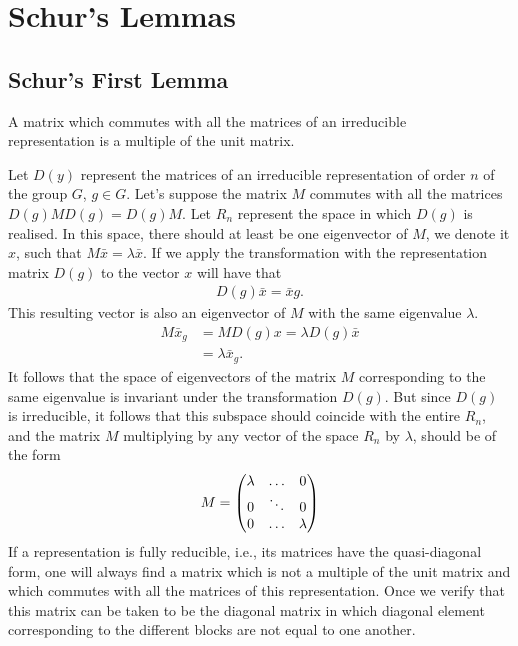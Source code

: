 \section{Schur's Lemmas}
\subsection{Schur's First Lemma} %
\label{sub:Schur's First Lemma}

\begin{epigraph}
    A matrix which commutes with all the matrices of an irreducible\\
    representation is a multiple of the unit matrix.
\end{epigraph}

Let $D(y)$ represent the matrices of an irreducible representation of order $n$
of the group $G$, $g\in G$. Let's suppose the matrix $M$ commutes with all the
matrices  $D(g)MD(g)=D(g)M$. Let $R_n$ represent the space in which $D(g)$ is
realised. In this space, there should at least be one eigenvector of $M$, we
denote it $x$, such that $M\bar{x}=\lambda\bar{x}$. If we apply the transformation with the representation matrix $D(g)$ to the vector $x$ will have that
\begin{align}
    D(g)\bar{x}=\bar{x}g.
\end{align}
This resulting vector is also an eigenvector of $M$ with the same eigenvalue
$\lambda$.
\begin{align}
    M\bar{x}_g&=MD(g)x=\lambda D(g)\bar{x}\\
              &=\lambda\bar{x}_g.
\end{align}
It follows that the space of eigenvectors of the matrix $M$ corresponding to
the same eigenvalue is invariant under the transformation $D(g)$. But since $D(g)$
is irreducible, it follows that this subspace should coincide with the entire
$R_n$, and the matrix $M$ multiplying by any vector of the space $R_n$ by
$\lambda$, should be of the form
\begin{align}
    M=\mqty(\lambda&\dots&0\\0&\ddots&0\\0&\dots&\lambda)
\end{align}
If a representation is fully reducible, i.e., its matrices have the quasi-diagonal
form, one will always find a matrix which is not a multiple of the unit matrix
and which commutes with all the matrices of this representation. Once we verify
that this matrix can be taken to be the diagonal matrix in which diagonal element
corresponding to the different blocks are not equal to one another.

